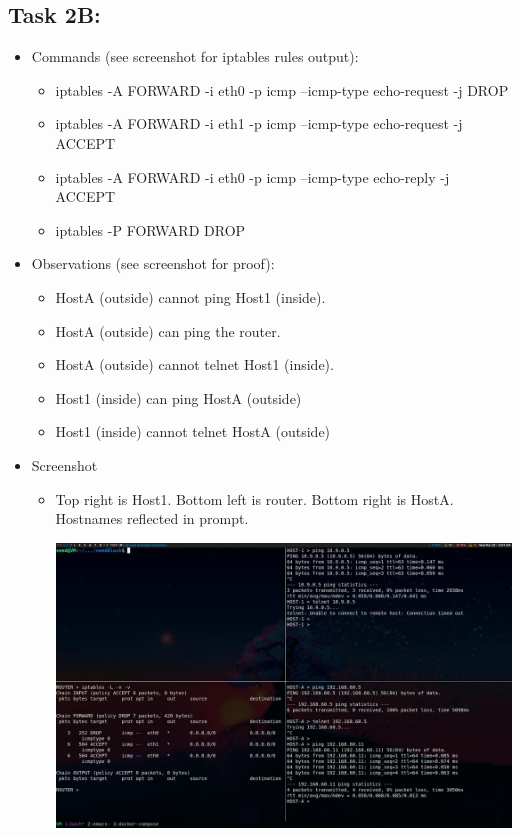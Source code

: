 \documentclass[11pt]{article}
\begin{document}
\subsection*{Task 2B:}
\label{sec:org10b1335}
\begin{itemize}
\item Commands (see screenshot for iptables rules output):
\begin{itemize}
\item iptables -A FORWARD -i eth0 -p icmp --icmp-type echo-request -j DROP
\item iptables -A FORWARD -i eth1 -p icmp --icmp-type echo-request -j ACCEPT
\item iptables -A FORWARD -i eth0 -p icmp --icmp-type echo-reply -j ACCEPT
\item iptables -P FORWARD DROP
\end{itemize}
\item Observations (see screenshot for proof):
\begin{itemize}
\item HostA (outside) cannot ping Host1 (inside).
\item HostA (outside) can ping the router.
\item HostA (outside) cannot telnet Host1 (inside).
\item Host1 (inside) can ping HostA (outside)
\item Host1 (inside) cannot telnet HostA (outside)
\end{itemize}
\item Screenshot
\begin{itemize}
\item Top right is Host1. Bottom left is router. Bottom right is HostA. Hostnames reflected in prompt.
\begin{center}
\includegraphics[width=.9\linewidth]{./images/07.jpg}
\end{center}
\end{itemize}
\end{itemize}
\end{document}

